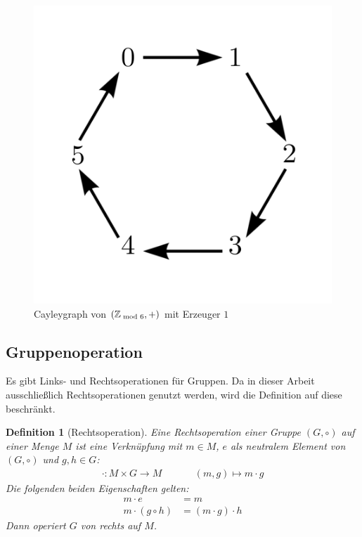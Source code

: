 \documentclass[12pt,a4paper, usenames, dvipsnames]{article}
\theoremstyle{mystyle}
\newtheorem{definition}{Definition}
\theoremstyle{definition}
\begin{document}
\begin{figure}[H]
\centering
\includegraphics[scale=0.7]{Cayleygraph3.png}
\caption{Cayleygraph von $(\mathbb{Z}_{\hspace*{-0.3em}\mod 6}, +)$ mit Erzeuger $1$}
\label{Abbildung_Cayleygraph}
\end{figure}


%
%
%
%
%
%
%
%
%
%

\subsection{Gruppenoperation}
 \label{Abschnitt_Gruppenoperation}



Es gibt Links- und Rechtsoperationen für Gruppen. Da in dieser Arbeit ausschließlich Rechtsoperationen genutzt werden, wird die Definition auf diese beschränkt.


\begin{definition}[Rechtsoperation]

Eine Rechtsoperation einer Gruppe $(G, \circ)$ auf einer Menge $M$ ist eine Verknüpfung mit $m \in M$, $e$ als neutralem Element von $(G,\circ)$ und $g,h \in G$:
\begin{align*}
\cdot: M \times G \rightarrow M \ \ \ \ \ \ \ \ \ \ \ \ \ \ \
(m, g) \mapsto m \cdot g 
\end{align*}
Die folgenden beiden Eigenschaften gelten:
\begin{align*}
m \cdot e & = m \\
m \cdot (g \circ h) & = (m \cdot g) \cdot h
\end{align*}
Dann operiert $G$ von rechts auf $M$.

\end{definition}
\end{document}
